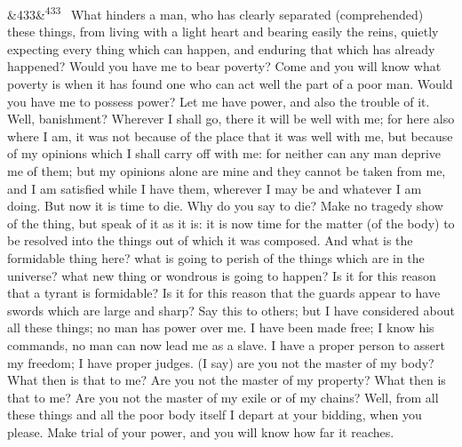 \documentclass[12pt]{article}
\newcommand{\para}[1][]{\par\noindent\ifx&#1&\else\textsuperscript{\footnotesize #1}~\fi}
\begin{document}
\para[433] What hinders a man, who has clearly separated (comprehended) these things, from living with a light heart and bearing easily the reins, quietly expecting every thing which can happen, and enduring that which has already happened? Would you have me to bear poverty? Come and you will know what poverty is when it has found one who can act well the part of a poor man. Would you have me to possess power? Let me have power, and also the trouble of it. Well, banishment? Wherever I shall go, there it will be well with me; for here also where I am, it was not because of the place that it was well with me, but because of my opinions which I shall carry off with me: for neither can any man deprive me of them; but my opinions alone are mine and they cannot be taken from me, and I am satisfied while I have them, wherever I may be and whatever I am doing. But now it is time to die. Why do you say to die? Make no tragedy show of the thing, but speak of it as it is: it is now time for the matter (of the body) to be resolved into the things out of which it was composed. And what is the formidable thing here? what is going to perish of the things which are in the universe? what new thing or wondrous is going to happen? Is it for this reason that a tyrant is formidable? Is it for this reason that the guards appear to have swords which are large and sharp? Say this to others; but I have considered about all these things; no man has power over me. I have been made free; I know his commands, no man can now lead me as a slave. I have a proper person to assert my freedom; I have proper judges. (I say) are you not the master of my body? What then is that to me? Are you not the master of my property? What then is that to me? Are you not the master of my exile or of my chains? Well, from all these things and all the poor body itself I depart at your bidding, when you please. Make trial of your power, and you will know how far it reaches.
\end{document}
